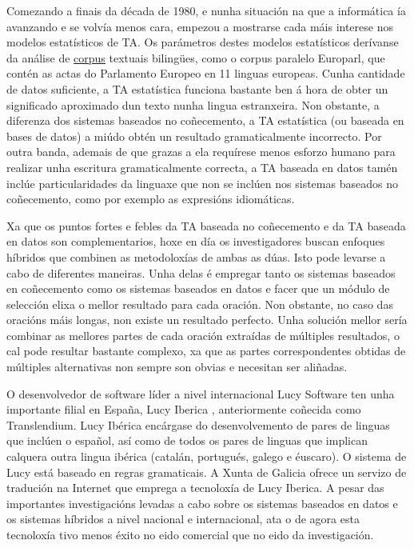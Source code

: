 \begin{multicols}{2}
Comezando a finais da década de 1980, e nunha situación na que a informática ía avanzando e se volvía menos cara, empezou a mostrarse cada máis interese nos modelos estatísticos de TA. Os parámetros destes modelos estatísticos derívanse da análise de \uline{corpus} textuais bilingües, como o corpus paralelo Europarl, que contén as actas do Parlamento Europeo en 11 linguas europeas. Cunha cantidade de datos suficiente, a TA estatística funciona bastante ben á hora de obter un significado aproximado dun texto nunha lingua estranxeira. Non obstante, a diferenza dos sistemas baseados no coñecemento, a TA estatística (ou baseada en bases de datos) a miúdo obtén un resultado gramaticalmente incorrecto. Por outra banda, ademais de que grazas a ela requírese menos esforzo humano para realizar unha escritura gramaticalmente correcta, a TA baseada en datos tamén inclúe particularidades da linguaxe que non se inclúen nos sistemas baseados no coñecemento, como por exemplo as expresións idiomáticas. 

Xa que os puntos fortes e febles da TA baseada no coñecemento e da TA baseada en datos son complementarios, hoxe en día os investigadores buscan enfoques híbridos que combinen as metodoloxías de ambas as dúas. Isto pode levarse a cabo de diferentes maneiras. Unha delas é empregar tanto os sistemas baseados en coñecemento como os sistemas baseados en datos e facer que un módulo de selección elixa o mellor resultado para cada oración. Non obstante, no caso das oracións máis longas, non existe un resultado perfecto. Unha solución mellor sería combinar as mellores partes de cada oración extraídas de múltiples resultados, o cal pode resultar bastante complexo, xa que as partes correspondentes obtidas de múltiples alternativas non sempre son obvias e necesitan ser aliñadas. 

O desenvolvedor de software líder a nivel internacional Lucy Software ten unha importante filial en España, Lucy Iberica \cite{GAL-Nota31}, anteriormente coñecida como Translendium. Lucy Ibérica encárgase do desenvolvemento de pares de linguas que inclúen o español, así como de todos os pares de linguas que implican calquera outra lingua ibérica (catalán, portugués, galego e éuscaro). O sistema de Lucy está baseado en regras gramaticais. A Xunta de Galicia \cite{GAL-Nota32} ofrece un servizo de tradución na Internet que emprega a tecnoloxía de Lucy Iberica. A pesar das importantes investigacións levadas a cabo sobre os sistemas baseados en datos e os sistemas híbridos a nivel nacional e internacional, ata o de agora esta tecnoloxía tivo menos éxito no eido comercial que no eido da investigación.


\end{multicols}

